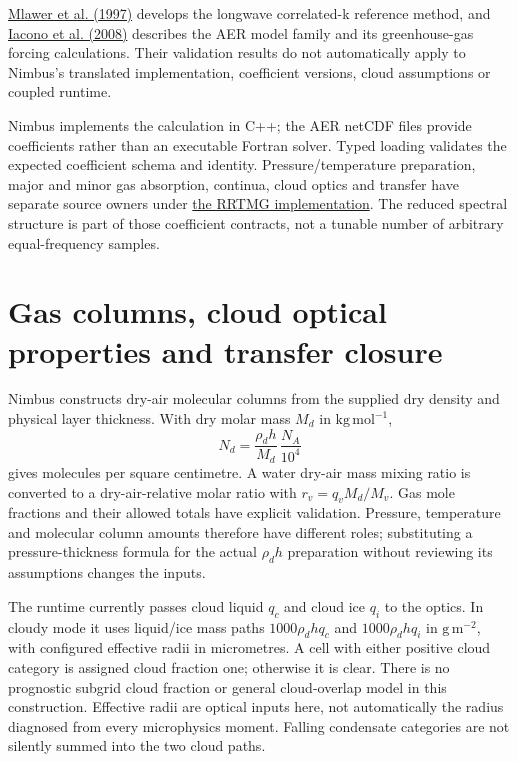 \href{https://doi.org/10.1029/97JD00237}{Mlawer et al. (1997)} develops the
longwave correlated-k reference method, and
\href{https://doi.org/10.1029/2008JD009944}{Iacono et al. (2008)} describes the
AER model family and its greenhouse-gas forcing calculations. Their validation
results do not automatically apply to Nimbus's translated implementation,
coefficient versions, cloud assumptions or coupled runtime.

Nimbus implements the calculation in C++; the AER netCDF files provide
coefficients rather than an executable Fortran solver. Typed loading validates
the expected coefficient schema and identity. Pressure/temperature preparation,
major and minor gas absorption, continua, cloud optics and transfer have
separate source owners under
\href{../src/radiation/schemes/rrtmg/}{the RRTMG implementation}. The reduced
spectral structure is part of those coefficient contracts, not a tunable number
of arbitrary equal-frequency samples.

\section{Gas columns, cloud optical properties and transfer closure}

Nimbus constructs dry-air molecular columns from the supplied dry density and
physical layer thickness. With dry molar mass $M_d$ in $\mathrm{kg\,mol^{-1}}$,
\[
 N_d=\frac{\rho_d h}{M_d}\,\frac{N_A}{10^4}
\]
gives molecules per square centimetre. A water dry-air mass mixing ratio is
converted to a dry-air-relative molar ratio with
$r_v=q_v M_d/M_v$. Gas mole fractions and their allowed totals have explicit
validation. Pressure, temperature and molecular column amounts therefore have
different roles; substituting a pressure-thickness formula for the actual
$\rho_d h$ preparation without reviewing its assumptions changes the inputs.

The runtime currently passes cloud liquid $q_c$ and cloud ice $q_i$ to the
optics. In cloudy mode it uses liquid/ice mass paths
$1000\rho_d h q_c$ and $1000\rho_d h q_i$ in $\mathrm{g\,m^{-2}}$, with
configured effective radii in micrometres. A cell with either positive cloud
category is assigned cloud fraction one; otherwise it is clear. There is no
prognostic subgrid cloud fraction or general cloud-overlap model in this
construction. Effective radii are optical inputs here, not automatically the
radius diagnosed from every microphysics moment. Falling condensate categories
are not silently summed into the two cloud paths.

